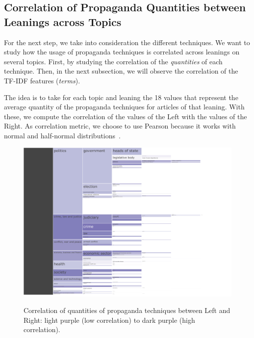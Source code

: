 \subsection{\statusgreen Correlation of Propaganda Quantities between Leanings across Topics}
\label{ssec:topic_propaganda_leaning_tech_quantities}




For the next step, we take into consideration the different techniques. We want to study how the usage of propaganda techniques is correlated across leanings on several topics.
%
First, by studying the correlation of the \emph{quantities} of each technique. Then, in the next subsection, we will observe the correlation of the TF-IDF features (\emph{terms}).

The idea is to take for each topic and leaning the 18 values that represent the average quantity of the propaganda techniques for articles of that leaning. With these, we compute the correlation of the values of the Left with the values of the Right.
%
As correlation metric, we choose to use Pearson because it works with normal and half-normal distributions~\cite{pearson1931analysis}.

\begin{figure}[!htbp]
    \centering
    \href{https://martinomensio.github.io/phd-project/figures/baly_iptc_weighted_prop_leaning_corr.html}{\includegraphics[trim={2.65cm 0cm 2.8cm 0cm},clip,width=\linewidth]{figures/baly_iptc_weighted_prop_leaning_corr.pdf}}
    \caption{Correlation of quantities of propaganda techniques between Left and Right: light purple (low correlation) to dark purple (high correlation).}
    \label{fig:baly_iptc_weighted_prop_leaning_corr}
\end{figure}


